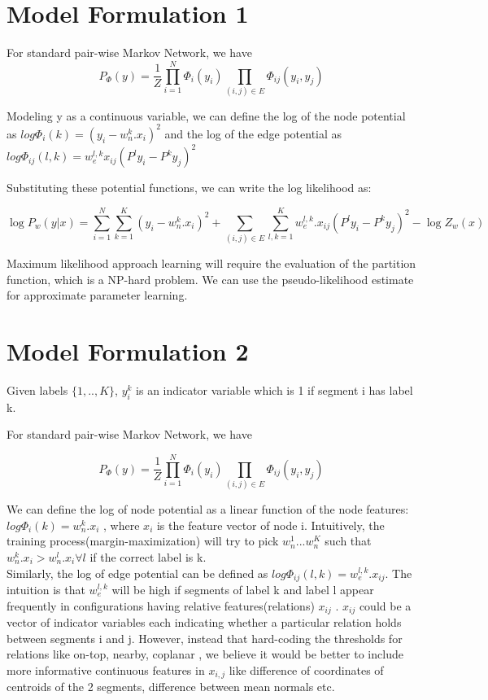 \documentclass[11pt,a4paper,oneside]{report}
\begin{document}
\section{Model Formulation 1}
For standard pair-wise Markov Network, we have 
\begin{equation}
  P_\Phi (y) = \frac{1}{Z} \prod_{i=1}^{N} \Phi_i(y_i) \prod_{(i,j)\in E} \Phi_{ij}(y_i,y_j)
  \end{equation}

Modeling y as a continuous variable, we can define the log of the node potential as 
$ log \Phi_i(k) = (y_i -  w_n^k.x_i )^2$  and the log of the edge potential as $ log \Phi_{ij}(l,k) = w_e^{l,k}x_{ij} (P^l y_i - P^k y_j)^2$


Substituting these potential functions, we can write the log likelihood as: 

\begin{equation}
 \log P_w (y|x) = \sum_{i=1}^{N} \sum_{k=1}^{K} (y_i - w^{k}_{n}.x_{i})^2 + \sum_{(i,j)\in E} \sum_{l,k=1}^{K} w_{e}^{l,k}.x_{ij}(P^l y_i - P^k y_j)^2 - \log Z_w(x)
\end{equation}


Maximum likelihood approach learning will require the evaluation of the partition function, which is a NP-hard problem. We can use the pseudo-likelihood estimate for approximate parameter learning. 



\section{Model Formulation 2}
Given labels $\{1,.., K\}$, $y_i^k$ is an indicator variable which is 1 if segment i has label k. 

For standard pair-wise Markov Network, we have 

\begin{equation}
  P_\Phi (y) = \frac{1}{Z} \prod_{i=1}^{N} \Phi_i(y_i) \prod_{(i,j)\in E} \Phi_{ij}(y_i,y_j)
  \end{equation}
  
  We can define the log of node potential as a linear function of the node features:  $log \Phi_i(k) = w_n^k.x_i$ , 
where $x_i$ is the feature vector of node i. Intuitively, the training process(margin-maximization) will try to pick $w_n^1...w_n^K$ such that $w_n^k.x_i>w_n^l.x_i \forall l$ if the correct label is k.\\
  Similarly, the log of edge potential can be defined as $log \Phi_{ij}(l,k) = w_{e}^{l,k}.x_{ij}$. The intuition is that $w_{e}^{l,k}$ will be high if segments of label k and label l appear frequently in configurations having relative features(relations) $x_{ij}$ . $x_{ij}$ could be a vector of indicator variables each indicating whether a particular relation holds between segments i and j.
However, instead that hard-coding the thresholds for relations like on-top, nearby, coplanar , we believe it would be better to include more informative continuous features in $x_{i,j}$ like difference of coordinates of centroids of the 2 segments, difference between mean normals etc.\\
\end{document}
